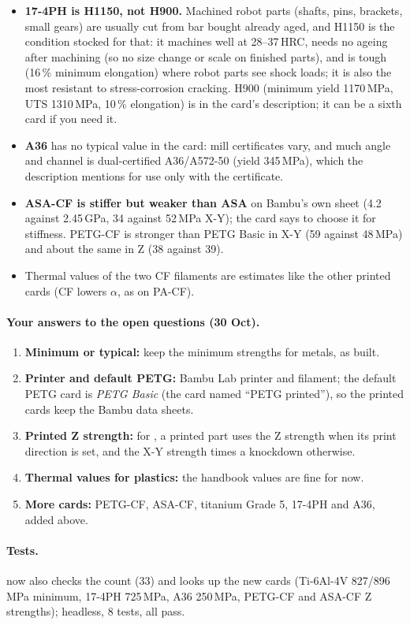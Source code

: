 \begin{itemize}[nosep]
  \item \textbf{17-4PH is H1150, not H900.} Machined robot parts (shafts, pins, brackets, small gears) are usually cut
        from bar bought already aged, and H1150 is the condition stocked for that: it machines well at 28--37\,HRC,
        needs no ageing after machining (so no size change or scale on finished parts), and is tough (16\,\% minimum
        elongation) where robot parts see shock loads; it is also the most resistant to stress-corrosion cracking.
        H900 (minimum yield 1170\,MPa, UTS 1310\,MPa, 10\,\% elongation) is in the card's description; it can be a
        sixth card if you need it.
  \item \textbf{A36} has no typical value in the card: mill certificates vary, and much angle and channel is
        dual-certified A36/A572-50 (yield 345\,MPa), which the description mentions for use only with the certificate.
  \item \textbf{ASA-CF is stiffer but weaker than ASA} on Bambu's own sheet (4.2 against 2.45\,GPa, 34 against
        52\,MPa X-Y); the card says to choose it for stiffness. PETG-CF is stronger than PETG Basic in X-Y (59 against
        48\,MPa) and about the same in Z (38 against 39).
  \item Thermal values of the two CF filaments are estimates like the other printed cards (CF lowers $\alpha$, as on
        PA-CF).
\end{itemize}

\paragraph{Your answers to the open questions (30 Oct).}
\begin{enumerate}[nosep]
  \item \textbf{Minimum or typical:} keep the minimum strengths for metals, as built.
  \item \textbf{Printer and default PETG:} Bambu Lab printer and filament; the default PETG card is \emph{PETG
        Basic} (the card named ``PETG printed''), so the printed cards keep the Bambu data sheets.
  \item \textbf{Printed Z strength:} for , a printed part uses the Z strength when its print direction is
        set, and the X-Y strength times a knockdown otherwise.
  \item \textbf{Thermal values for plastics:} the handbook values are fine for now.
  \item \textbf{More cards:} PETG-CF, ASA-CF, titanium Grade 5, 17-4PH and A36, added above.
\end{enumerate}

\paragraph{Tests.}  now also checks the count (33) and looks up the new cards
(Ti-6Al-4V 827/896\,MPa minimum, 17-4PH 725\,MPa, A36 250\,MPa, PETG-CF and ASA-CF Z strengths); headless, 8 tests,
all pass.
